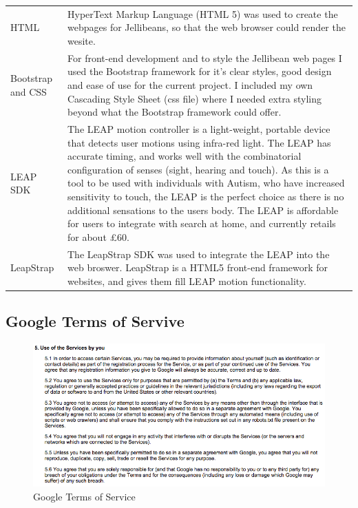 \documentclass[a4paper, 11pt]{article}
\begin{document}
\begin{tabular}{l p{11cm} }
HTML & HyperText Markup Language (HTML 5) was used to create the webpages for Jellibeans, so that the web browser could render the wesite.\\
Bootstrap and CSS & For front-end development and to style the Jellibean web pages I used the Bootstrap framework \cite{bootstrap} for it's clear styles, good design and ease of use for the current project. I included my own Cascading Style Sheet (css file) where I needed extra styling beyond what the Bootstrap framework could offer. \\
LEAP SDK & The LEAP motion controller is a light-weight, portable device that detects user motions using infra-red light. The LEAP has accurate timing, and works well with the combinatorial configuration of senses (sight, hearing and touch). As this is a tool to be used with individuals with Autism, who have increased sensitivity to touch, the LEAP is the perfect choice as there is no additional sensations to the users body. The LEAP is affordable for users to integrate with search at home, and currently retails for about \pounds60.\\
LeapStrap & The LeapStrap SDK was used to integrate the LEAP into the web broswer. LeapStrap is a HTML5 front-end framework for websites, and gives them fill LEAP motion functionality. \\
\end{tabular}

\newpage
\subsection{Google Terms of Servive} \label{GoogleToS1}
\begin{figure}[H]
\begin{center}
\includegraphics[scale=0.6]{GoogleToS}
\caption{Google Terms of Service}
\end{center}
\end{figure}
\end{document}
